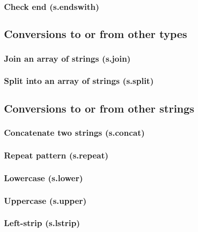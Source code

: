 \documentclass{article}
\theoremstyle{definition}
\begin{document}
\subsubsection{Check end (s.endswith)}

\subsection{Conversions to or from other types}

\subsubsection{Join an array of strings (s.join)}

\subsubsection{Split into an array of strings (s.split)}

\subsection{Conversions to or from other strings}

\subsubsection{Concatenate two strings (s.concat)}

\subsubsection{Repeat pattern (s.repeat)}

\subsubsection{Lowercase (s.lower)}

\subsubsection{Uppercase (s.upper)}

\subsubsection{Left-strip (s.lstrip)}
\end{document}
